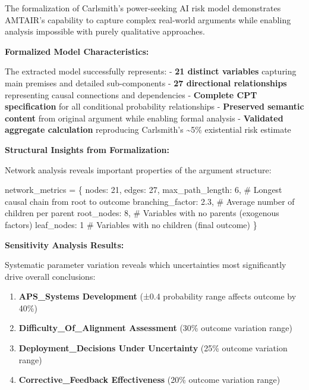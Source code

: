 \documentclass[
  11pt,
  letterpaper,
]{book}
\newenvironment{Shaded}{\begin{snugshade}}{\end{snugshade}}
\newcommand{\CommentTok}[1]{\textcolor[rgb]{0.37,0.37,0.37}{#1}}
\newcommand{\DecValTok}[1]{\textcolor[rgb]{0.68,0.00,0.00}{#1}}
\newcommand{\FloatTok}[1]{\textcolor[rgb]{0.68,0.00,0.00}{#1}}
\newcommand{\NormalTok}[1]{\textcolor[rgb]{0.00,0.23,0.31}{#1}}
\newcommand{\OperatorTok}[1]{\textcolor[rgb]{0.37,0.37,0.37}{#1}}
\newcommand{\StringTok}[1]{\textcolor[rgb]{0.13,0.47,0.30}{#1}}
\providecommand{\tightlist}{%
  \setlength{\itemsep}{0pt}\setlength{\parskip}{0pt}}
\begin{document}
The formalization of Carlsmith's power-seeking AI risk model
demonstrates AMTAIR's capability to capture complex real-world arguments
while enabling analysis impossible with purely qualitative approaches.

\textbf{Formalized Model Characteristics:}

The extracted model successfully represents: - \textbf{21 distinct
variables} capturing main premises and detailed sub-components -
\textbf{27 directional relationships} representing causal connections
and dependencies - \textbf{Complete CPT specification} for all
conditional probability relationships - \textbf{Preserved semantic
content} from original argument while enabling formal analysis -
\textbf{Validated aggregate calculation} reproducing Carlsmith's
\textasciitilde5\% existential risk estimate

\textbf{Structural Insights from Formalization:}

Network analysis reveals important properties of the argument structure:

\begin{Shaded}
\begin{Highlighting}[]
\NormalTok{network\_metrics }\OperatorTok{=}\NormalTok{ \{}
    \StringTok{\textquotesingle{}nodes\textquotesingle{}}\NormalTok{: }\DecValTok{21}\NormalTok{,}
    \StringTok{\textquotesingle{}edges\textquotesingle{}}\NormalTok{: }\DecValTok{27}\NormalTok{, }
    \StringTok{\textquotesingle{}max\_path\_length\textquotesingle{}}\NormalTok{: }\DecValTok{6}\NormalTok{,  }\CommentTok{\# Longest causal chain from root to outcome}
    \StringTok{\textquotesingle{}branching\_factor\textquotesingle{}}\NormalTok{: }\FloatTok{2.3}\NormalTok{,  }\CommentTok{\# Average number of children per parent}
    \StringTok{\textquotesingle{}root\_nodes\textquotesingle{}}\NormalTok{: }\DecValTok{8}\NormalTok{,  }\CommentTok{\# Variables with no parents (exogenous factors)}
    \StringTok{\textquotesingle{}leaf\_nodes\textquotesingle{}}\NormalTok{: }\DecValTok{1}   \CommentTok{\# Variables with no children (final outcome)}
\NormalTok{\}}
\end{Highlighting}
\end{Shaded}

\textbf{Sensitivity Analysis Results:}

Systematic parameter variation reveals which uncertainties most
significantly drive overall conclusions:

\begin{enumerate}
\def\labelenumi{\arabic{enumi}.}
\tightlist
\item
  \textbf{APS\_Systems Development} (±0.4 probability range affects
  outcome by 40\%)
\item
  \textbf{Difficulty\_Of\_Alignment Assessment} (30\% outcome variation
  range)
\item
  \textbf{Deployment\_Decisions Under Uncertainty} (25\% outcome
  variation range)
\item
  \textbf{Corrective\_Feedback Effectiveness} (20\% outcome variation
  range)
\end{enumerate}
\end{document}

